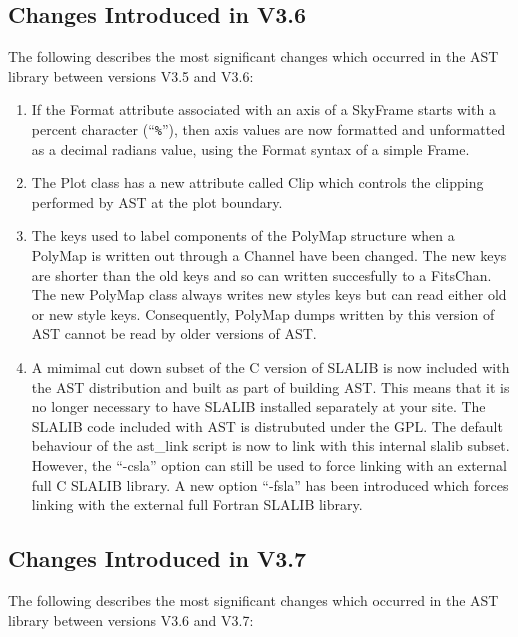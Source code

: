 \documentclass[twoside,11pt]{starlink}
\begin{document}
\subsection{Changes Introduced in V3.6}

The following describes the most significant changes which
occurred in the AST library between versions V3.5 and V3.6:

\begin{enumerate}

\item If the Format attribute associated with an axis of a SkyFrame
starts with a percent character (``\verb+%+''), then axis values are
now formatted and unformatted as a decimal radians value, using the
Format syntax of a simple Frame.

\item The Plot class has a new attribute called Clip which controls the
clipping performed by AST at the plot boundary.

\item The keys used to label components of the PolyMap structure when a
PolyMap is written out through a Channel have been changed. The new keys
are shorter than the old keys and so can written succesfully to a FitsChan.
The new PolyMap class always writes new styles keys but can read either
old or new style keys. Consequently, PolyMap dumps written by this
version of AST cannot be read by older versions of AST.

\item A mimimal cut down subset of the C version of SLALIB is now
included with the AST distribution and built as part of building AST.
This means that it is no longer necessary to have SLALIB installed
separately at your site. The SLALIB code included with AST is distrubuted
under the GPL. The default behaviour of the ast\_link script is now to
link with this internal slalib subset. However, the ``-csla'' option can
still be used to force linking with an external full C SLALIB library.
A new option ``-fsla'' has been introduced which forces linking with the
external full Fortran SLALIB library.

\end{enumerate}

\subsection{Changes Introduced in V3.7}

The following describes the most significant changes which
occurred in the AST library between versions V3.6 and V3.7:
\end{document}
